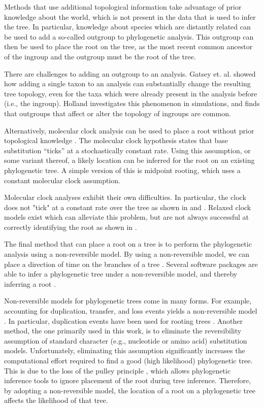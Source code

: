 \documentclass{article}
\begin{document}
Methods that use additional topological information take advantage of prior
knowledge about the world, which is not present in the data that is used to
infer the tree. In particular, knowledge about species which are distantly
related can be used to add a so-called outgroup to phylogenetic analysis.  This
outgroup can then be used to place the root on the tree, as the most recent
common ancestor of the ingroup and the outgroup must be the root of the tree.

There are challenges to adding an outgroup to an analysis.  Gatsey et. al.
\cite{gatesy_how_2007} showed how adding a single taxon to an analysis can
substantially change the resulting tree topology, even for the taxa which were
already present in the analysis before (i.e., the ingroup).  Holland
\cite{holland_outgroup_2003} investigates this phenomenon in simulations, and
finds that outgroups that affect or alter the topology of ingroups are common.

Alternatively, molecular clock analysis can be used to place a root without
prior topological knowledge \cite{yang_computational_2006}.  The molecular clock
hypothesis states that base substitution ``ticks'' at a stochastically constant
rate.  Using this assumption, or some variant thereof, a likely location can be
inferred for the root on an existing phylogenetic tree.  A simple version of
this is midpoint rooting, which uses a constant molecular clock assumption.

Molecular clock analyses exhibit their own difficulties. In particular, the
clock does not "tick" at a constant rate over the tree as shown in
\cite{li_molecular_1987} and \cite{steiper_primate_2006}. Relaxed clock models
exist which can alleviate this problem, but are not always successful at
correctly identifying the root as shown in \cite{battistuzzi_performance_2010}.

The final method that can place a root on a tree is to perform the phylogenetic
analysis using a non-reversible model. By using a non-reversible model, we can
place a direction of time on the branches of a tree \cite{yap_rooting_2005}.
Several software packages are able to infer a phylogenetic tree under a
non-reversible model, and thereby inferring a root \cite{nguyen_iq-tree:_2015,
ronquist_mrbayes_2003}.

Non-reversible models for phylogenetic trees come in many forms.  For example,
accounting for duplication, transfer, and loss events yields a non-reversible
model \cite{morel_generax:_2019}.  In particular, duplication events have been
used for rooting trees \cite{emms_stride:_2017}.  Another method, the one primarily
used in this work, is to eliminate the reversibility assumption of standard
character (e.g., nucleotide or amino acid) substitution models.  Unfortunately,
eliminating this assumption significantly increases the computational effort
required to find a good (high likelihood) phylogenetic tree.  This is due to the
loss of the pulley principle \cite{felsenstein_evolutionary_1981}, which allows
phylogenetic inference tools to ignore placement of the root during tree
inference.  Therefore, by adopting a non-reversible model, the location of a
root on a phylogenetic tree affects the likelihood of that tree.
\end{document}
